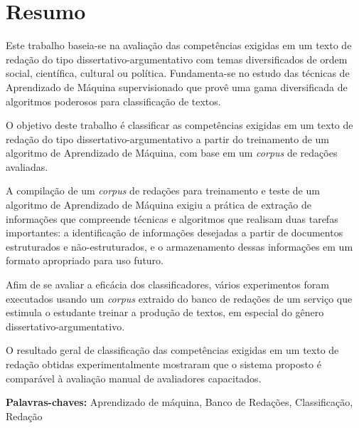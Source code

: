 \chapter*{Resumo}

\noindent Este trabalho baseia-se na avaliação das competências exigidas em um texto de redação do tipo dissertativo-argumentativo com temas diversificados de ordem social, científica, cultural ou política. Fundamenta-se no estudo das técnicas de Aprendizado de Máquina supervisionado que provê uma gama diversificada de algoritmos poderosos para classificação de textos.

O objetivo deste trabalho é classificar as competências exigidas em um texto de redação do tipo dissertativo-argumentativo a partir do treinamento de um algoritmo de Aprendizado de Máquina, com base em um \textit{corpus} de redações avaliadas.

A compilação de um \textit{corpus} de redações para treinamento e teste de um algoritmo de Aprendizado de Máquina exigiu a prática de extração de informações que compreende técnicas e algoritmos que realisam duas tarefas importantes: a identificação de informações desejadas a partir de documentos estruturados e não-estruturados, e o armazenamento dessas informações em um formato apropriado para uso futuro.

Afim de se avaliar a eficácia dos classificadores, vários experimentos foram executados usando um \textit{corpus} extraido do banco de redações de um serviço que estimula o estudante treinar a produção de textos, em especial do gênero dissertativo-argumentativo. 

O resultado geral de classificação das competências exigidas em um texto de redação obtidas experimentalmente mostraram que o sistema proposto é comparável à avaliação manual de avaliadores capacitados.

\textbf{Palavras-chaves:} Aprendizado de máquina, Banco de Redações, Classificação, Redação